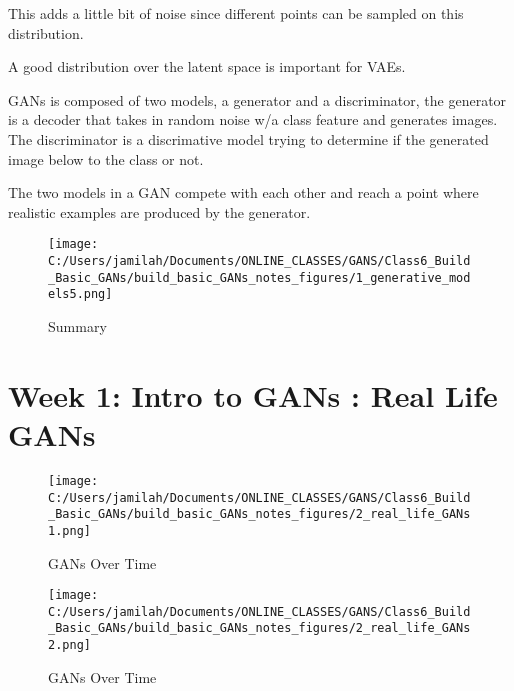 \documentclass[11pt, onecolumn]{article}
\begin{document}
This adds a little bit of noise since different points can be sampled on this distribution.

A good distribution over the latent space is important for VAEs.

GANs is composed of two models, a generator and a discriminator, the generator is a decoder that takes in random noise w/a class feature and generates images.  The discriminator is a discrimative model trying to determine if the generated image below to the class or not.

The two models in a GAN compete with each other and reach a point where realistic examples are produced by the generator.

\begin{figure}[htp]
\begin{center}
\texttt{[image: C:/Users/jamilah/Documents/ONLINE\_CLASSES/GANS/Class6\_Build\_Basic\_GANs/build\_basic\_GANs\_notes\_figures/1\_generative\_models5.png]}
\end{center}
\caption{Summary}
\label{1_generative_models5}
\end{figure}

\clearpage
\section{Week 1: Intro to GANs : Real Life GANs}

\begin{figure}[htp]
\begin{center}
\texttt{[image: C:/Users/jamilah/Documents/ONLINE\_CLASSES/GANS/Class6\_Build\_Basic\_GANs/build\_basic\_GANs\_notes\_figures/2\_real\_life\_GANs1.png]}
\end{center}
\caption{GANs Over Time}
\label{2_real_life_GANs1}
\end{figure}

\begin{figure}[htp]
\begin{center}
\texttt{[image: C:/Users/jamilah/Documents/ONLINE\_CLASSES/GANS/Class6\_Build\_Basic\_GANs/build\_basic\_GANs\_notes\_figures/2\_real\_life\_GANs2.png]}
\end{center}
\caption{GANs Over Time}
\label{2_real_life_GANs2}
\end{figure}
\end{document}
